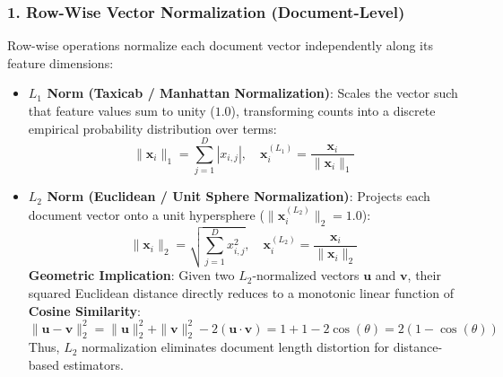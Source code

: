 \documentclass[12pt]{article}
\begin{document}
\subsubsection{1. Row-Wise Vector Normalization (Document-Level)}
Row-wise operations normalize each document vector independently along its feature dimensions:
\begin{itemize}
    \item \textbf{$L_1$ Norm (Taxicab / Manhattan Normalization)}:
    Scales the vector such that feature values sum to unity ($1.0$), transforming counts into a discrete empirical probability distribution over terms:
    \begin{equation}
        \|\mathbf{x}_i\|_1 = \sum_{j=1}^{D} |x_{i,j}|, \quad \mathbf{x}_{i}^{(L_1)} = \frac{\mathbf{x}_i}{\|\mathbf{x}_i\|_1}
    \end{equation}
    \item \textbf{$L_2$ Norm (Euclidean / Unit Sphere Normalization)}:
    Projects each document vector onto a unit hypersphere ($\|\mathbf{x}_{i}^{(L_2)}\|_2 = 1.0$):
    \begin{equation}
        \|\mathbf{x}_i\|_2 = \sqrt{\sum_{j=1}^{D} x_{i,j}^2}, \quad \mathbf{x}_{i}^{(L_2)} = \frac{\mathbf{x}_i}{\|\mathbf{x}_i\|_2}
    \end{equation}
    \textbf{Geometric Implication}: Given two $L_2$-normalized vectors $\mathbf{u}$ and $\mathbf{v}$, their squared Euclidean distance directly reduces to a monotonic linear function of \textbf{Cosine Similarity}:
    \begin{equation}
        \|\mathbf{u} - \mathbf{v}\|_2^2 = \|\mathbf{u}\|_2^2 + \|\mathbf{v}\|_2^2 - 2(\mathbf{u} \cdot \mathbf{v}) = 1 + 1 - 2\cos(\theta) = 2(1 - \cos(\theta))
    \end{equation}
    Thus, $L_2$ normalization eliminates document length distortion for distance-based estimators.
\end{itemize}
\end{document}
